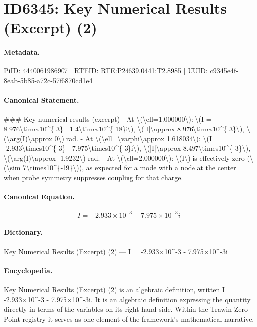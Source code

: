 \section*{ID6345: Key Numerical Results (Excerpt) (2)}
\paragraph{Metadata.}
PiID: 4440061986907 | RTEID: RTE:P24639.0441:T2.8985 | UUID: c9345e4f-8eab-5b85-a72c-57f5870cd1e4

\paragraph{Canonical Statement.}
\#\#\# Key numerical results (excerpt) - At \textbackslash{}(\textbackslash{}ell=1.000000\textbackslash{}): \textbackslash{}(I = 8.976\textbackslash{}times10\textasciicircum{}\{-3\} - 1.4\textbackslash{}times10\textasciicircum{}\{-18\}i\textbackslash{}), \textbackslash{}(|I|\textbackslash{}approx 8.976\textbackslash{}times10\textasciicircum{}\{-3\}\textbackslash{}), \textbackslash{}(\textbackslash{}arg(I)\textbackslash{}approx 0\textbackslash{}) rad. - At \textbackslash{}(\textbackslash{}ell=\textbackslash{}varphi\textbackslash{}approx 1.618034\textbackslash{}): \textbackslash{}(I = -2.933\textbackslash{}times10\textasciicircum{}\{-3\} - 7.975\textbackslash{}times10\textasciicircum{}\{-3\}i\textbackslash{}), \textbackslash{}(|I|\textbackslash{}approx 8.497\textbackslash{}times10\textasciicircum{}\{-3\}\textbackslash{}), \textbackslash{}(\textbackslash{}arg(I)\textbackslash{}approx -1.9232\textbackslash{}) rad. - At \textbackslash{}(\textbackslash{}ell=2.000000\textbackslash{}): \textbackslash{}(I\textbackslash{}) is effectively zero (\textbackslash{}(\textbackslash{}sim 7\textbackslash{}times10\textasciicircum{}\{-19\}\textbackslash{})), as expected for a mode with a node at the center when probe symmetry suppresses coupling for that charge.

\paragraph{Canonical Equation.}
\[
I = -2.933\times10^{-3} - 7.975\times10^{-3}i
\]

\paragraph{Dictionary.}
Key Numerical Results (Excerpt) (2) — I = -2.933×10\textasciicircum{}-3 - 7.975×10\textasciicircum{}-3i

\paragraph{Encyclopedia.}
Key Numerical Results (Excerpt) (2) is an algebraic definition, written I = -2.933×10\textasciicircum{}-3 - 7.975×10\textasciicircum{}-3i. It is an algebraic definition expressing the quantity directly in terms of the variables on its right-hand side. Within the Trawin Zero Point registry it serves as one element of the framework's mathematical narrative.
